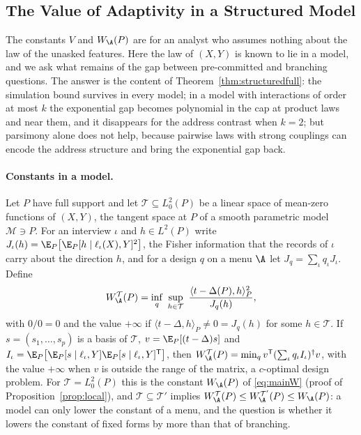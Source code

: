 \subsection{The Value of Adaptivity in a Structured Model}\label{app:structured}
The constants $V$ and $W_\A(P)$ are for an analyst who assumes nothing about
the law of the unasked features. Here the law of $(X,Y)$ is known to lie in a
model, and we ask what remains of the gap between pre-committed and branching
questions. The answer is the content of Theorem~\ref{thm:structuredfull}: the
simulation bound survives in every model; in a model with interactions of
order at most $k$ the exponential gap becomes polynomial in the cap at
product laws and near them, and it disappears for the address contrast when
$k=2$; but parsimony alone does not help, because pairwise laws with strong
couplings can encode the address structure and bring the exponential gap
back.

\paragraph{Constants in a model.}
Let $P$ have full support and let $\mathcal T\subseteq L^2_0(P)$ be a linear
space of mean-zero functions of $(X,Y)$, the tangent space at $P$ of a smooth
parametric model $\mathcal M\ni P$. For an interview $\iota$ and $h\in L^2(P)$
write $J_\iota(h)=\E_P\big[\E_P[h\mid\ell_\iota(X),Y]^2\big]$, the Fisher
information that the records of $\iota$ carry about the direction $h$, and
for a design $q$ on a menu $\A$ let $J_q=\sum_\iota q_\iota J_\iota$. Define
\begin{equation}
 W^{\mathcal T}_\A(P)=\inf_q\ \sup_{h\in\mathcal T}\ \frac{\langle t-\Delta(P),h\rangle_P^2}{J_q(h)},\label{eq:WT}
\end{equation}
with $0/0=0$ and the value $+\infty$ if $\langle t-\Delta,h\rangle_P\ne0=J_q(h)$
for some $h\in\mathcal T$. If $s=(s_1,\ldots,s_p)$ is a basis of
$\mathcal T$, $v=\E_P[(t-\Delta)s]$ and
$I_\iota=\E_P\big[\E_P[s\mid\ell_\iota,Y]\E_P[s\mid\ell_\iota,Y]^{\mathsf T}\big]$,
then $W^{\mathcal T}_\A(P)=\min_qv^{\mathsf T}(\sum_\iota q_\iota I_\iota)^\dagger v$,
with the value $+\infty$ when $v$ is outside the range of the matrix, a
$c$-optimal design problem. For $\mathcal T=L^2_0(P)$ this is the constant
$W_\A(P)$ of \eqref{eq:mainW} (proof of Proposition~\ref{prop:local}), and
$\mathcal T\subseteq\mathcal T'$ implies
$W^{\mathcal T}_\A(P)\le W^{\mathcal T'}_\A(P)\le W_\A(P)$: a model can only
lower the constant of a menu, and the question is whether it lowers the
constant of fixed forms by more than that of branching.


